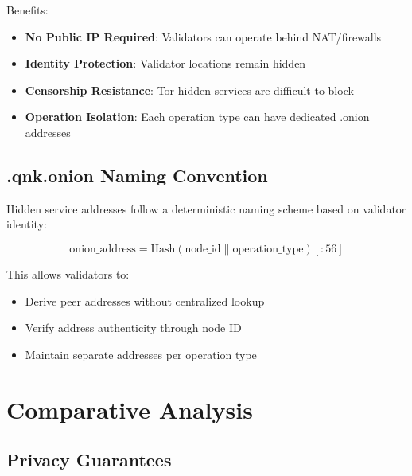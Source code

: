 \documentclass[11pt,a4paper]{article}
\begin{document}
Benefits:
\begin{itemize}[leftmargin=*]
    \item \textbf{No Public IP Required}: Validators can operate behind NAT/firewalls
    \item \textbf{Identity Protection}: Validator locations remain hidden
    \item \textbf{Censorship Resistance}: Tor hidden services are difficult to block
    \item \textbf{Operation Isolation}: Each operation type can have dedicated .onion addresses
\end{itemize}

\subsection{.qnk.onion Naming Convention}

Hidden service addresses follow a deterministic naming scheme based on validator identity:

\begin{equation}
\text{onion\_address} = \text{Hash}(\text{node\_id} \| \text{operation\_type})[:56]
\end{equation}

This allows validators to:
\begin{itemize}[leftmargin=*]
    \item Derive peer addresses without centralized lookup
    \item Verify address authenticity through node ID
    \item Maintain separate addresses per operation type
\end{itemize}

\section{Comparative Analysis}

\subsection{Privacy Guarantees}
\end{document}
